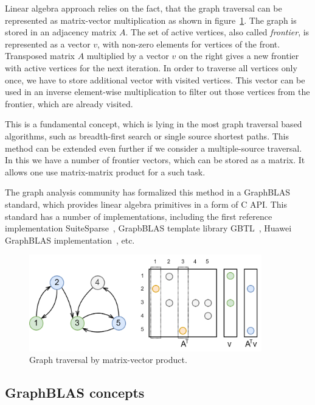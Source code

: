 Linear algebra approach relies on the fact, that the graph traversal can be represented as matrix-vector multiplication as shown in figure~\ref{fig:gt_mxv}. The graph is stored in an adjacency matrix $A$. The set of active vertices, also called \textit{frontier}, is represented as a vector $v$, with non-zero elements for vertices of the front. Transposed matrix $A$ multiplied by a vector $v$ on the right gives a new frontier with active vertices for the next iteration. In order to traverse all vertices only once, we have to store additional vector with visited vertices. This vector can be used in an inverse element-wise multiplication to filter out those vertices from the frontier, which are already visited. 

This is a fundamental concept, which is lying in the most graph traversal based algorithms, such as breadth-first search or single source shortest paths. This method can be extended even further if we consider a multiple-source traversal. In this we have a number of frontier vectors, which can be stored as a matrix. It allows one use matrix-matrix product for a such task.

The graph analysis community has formalized this method in a GraphBLAS~\cite{paper:graphblas_foundations} standard, which provides linear algebra primitives in a form of C API. This standard has a number of implementations, including the first reference implementation SuiteSparse~\cite{article:suite_sparse_for_graph_problems}, GrapbBLAS template library GBTL~\cite{article:gbtl}, Huawei GraphBLAS implementation~\cite{article:hu_graphblas_impl}, etc.

\begin{figure}[h]
    \centering
    \includegraphics[width=0.9\textwidth]{images/graph_traversal_mxv.png}
    \caption{Graph traversal by matrix-vector product.}
    \label{fig:gt_mxv}
\end{figure}

\subsection{GraphBLAS concepts}

